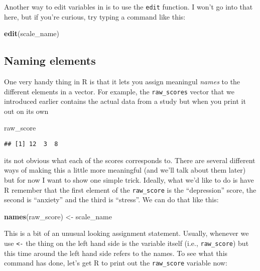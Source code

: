 \documentclass[]{book}
\newenvironment{Shaded}{\begin{snugshade}}{\end{snugshade}}
\newcommand{\KeywordTok}[1]{\textcolor[rgb]{0.13,0.29,0.53}{\textbf{#1}}}
\newcommand{\NormalTok}[1]{#1}
\newcommand{\StringTok}[1]{\textcolor[rgb]{0.31,0.60,0.02}{#1}}
\begin{document}
Another way to edit variables in is to use the \texttt{edit} function. I won't go into that here, but if you're curious, try typing a command like this:

\begin{Shaded}
\begin{Highlighting}[]
\KeywordTok{edit}\NormalTok{(scale_name)}
\end{Highlighting}
\end{Shaded}

\hypertarget{naming-elements}{%
\subsection{Naming elements}\label{naming-elements}}

One very handy thing in R is that it lets you assign meaningul \emph{names} to the different elements in a vector. For example, the \texttt{raw\_scores} vector that we introduced earlier contains the actual data from a study but when you print it out on its own

\begin{Shaded}
\begin{Highlighting}[]
\NormalTok{raw_score}
\end{Highlighting}
\end{Shaded}

\begin{verbatim}
## [1] 12  3  8
\end{verbatim}

its not obvious what each of the scores corresponds to. There are several different ways of making this a little more meaningful (and we'll talk about them later) but for now I want to show one simple trick. Ideally, what we'd like to do is have R remember that the first element of the \texttt{raw\_score} is the ``depression'' score, the second is ``anxiety'' and the third is ``stress''. We can do that like this:

\begin{Shaded}
\begin{Highlighting}[]
\KeywordTok{names}\NormalTok{(raw_score) <-}\StringTok{ }\NormalTok{scale_name}
\end{Highlighting}
\end{Shaded}

This is a bit of an unusual looking assignment statement. Usually, whenever we use \texttt{\textless{}-} the thing on the left hand side is the variable itself (i.e., \texttt{raw\_score}) but this time around the left hand side refers to the names. To see what this command has done, let's get R to print out the \texttt{raw\_score} variable now:
\end{document}
